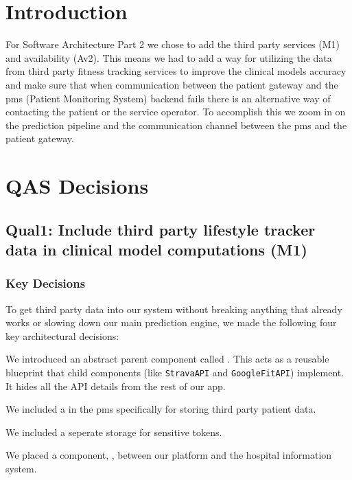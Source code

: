 
\chapter{Introduction}\label{sec:introduction}
For Software Architecture Part 2 we chose to add the third party services (M1) and availability (Av2).
This means we had to add a way for utilizing the data from third party fitness tracking services to improve the clinical models accuracy and make sure that when communication between the patient gateway and the pms (Patient Monitoring System) backend fails there is an alternative way of contacting the patient or the service operator.
To accomplish this we zoom in on the prediction pipeline and the communication channel between the pms and the patient gateway.


\chapter{QAS Decisions}\label{sec:decisions}



\section{Qual1: Include third party lifestyle tracker data in clinical model computations (M1)}
\subsection*{Key Decisions}
To get  third party data into our system without breaking anything that already works or slowing down our main prediction engine, we made the following four key architectural decisions:
\begin{adlist}
	\item  We introduced an abstract parent component called . This acts as a reusable blueprint that child components (like \texttt{StravaAPI} and \texttt{GoogleFitAPI}) implement. It hides all the API details from the rest of our app.

	\item  We included a  in the pms specifically for storing third party patient data.

	\item We included a seperate storage  for sensitive tokens.

  \item  We placed a component, , between our platform and the hospital information system.
\end{adlist}

